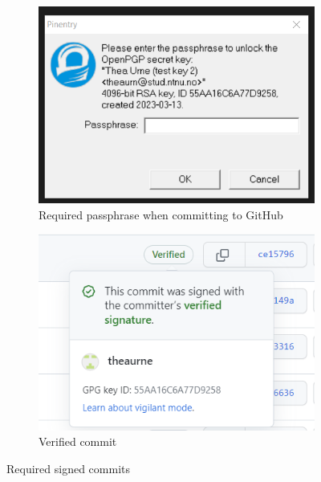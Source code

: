 \vspace{2mm}
\begin{figure}[H]
  \centering
  \begin{subfigure}[H]{0.4\textwidth}
    \includegraphics[width=\textwidth]{Images/signedcommits.png}
    \caption{Required passphrase when committing to GitHub}
    \label{fig:image1}
  \end{subfigure}
  \hfill
  \begin{subfigure}[H]{0.4\textwidth}
    \includegraphics[width=\textwidth]{Images/verified-commit.png}
    \caption{Verified commit}
    \label{fig:image2}
  \end{subfigure}
  \caption{Required signed commits}
  \label{fig:overall}
\end{figure}

